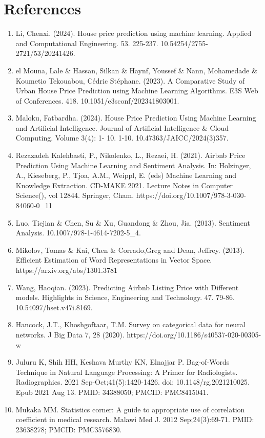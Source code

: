 \documentclass[a4paper,12pt]{article}
\begin{document}
\section*{References}
\begin{enumerate}
  \item Li, Chenxi. (2024). House price prediction using machine learning. Applied and Computational Engineering. 53. 225-237. 10.54254/2755-2721/53/20241426.
  \item el Mouna, Lale \& Hassan, Silkan \& Haynf, Youssef \& Nann, Mohamedade \& Koumetio Tekouabou, Cédric Stéphane. (2023). A Comparative Study of Urban House Price Prediction using Machine Learning Algorithms. E3S Web of Conferences. 418. 10.1051/e3sconf/202341803001. 
  \item Maloku, Fatbardha. (2024). House Price Prediction Using Machine Learning and Artificial Intelligence. Journal of Artificial Intelligence \& Cloud Computing. Volume 3(4): 1- 10. 1-10. 10.47363/JAICC/2024(3)357. 
  \item Rezazadeh Kalehbasti, P., Nikolenko, L., Rezaei, H. (2021). Airbnb Price Prediction Using Machine Learning and Sentiment Analysis. In: Holzinger, A., Kieseberg, P., Tjoa, A.M., Weippl, E. (eds) Machine Learning and Knowledge Extraction. CD-MAKE 2021. Lecture Notes in Computer Science(), vol 12844. Springer, Cham. https://doi.org/10.1007/978-3-030-84060-0\_11
  \item Luo, Tiejian \& Chen, Su \& Xu, Guandong \& Zhou, Jia. (2013). Sentiment Analysis. 10.1007/978-1-4614-7202-5\_4. 
  \item Mikolov, Tomas \& Kai, Chen \& Corrado,Greg and Dean, Jeffrey. (2013). Efficient Estimation of Word Representations in Vector Space. https://arxiv.org/abs/1301.3781
  \item Wang, Haoqian. (2023). Predicting Airbnb Listing Price with Different models. Highlights in Science, Engineering and Technology. 47. 79-86. 10.54097/hset.v47i.8169.
  \item Hancock, J.T., Khoshgoftaar, T.M. Survey on categorical data for neural networks. J Big Data 7, 28 (2020). https://doi.org/10.1186/s40537-020-00305-w
  \item Juluru K, Shih HH, Keshava Murthy KN, Elnajjar P. Bag-of-Words Technique in Natural Language Processing: A Primer for Radiologists. Radiographics. 2021 Sep-Oct;41(5):1420-1426. doi: 10.1148/rg.2021210025. Epub 2021 Aug 13. PMID: 34388050; PMCID: PMC8415041.
  \item Mukaka MM. Statistics corner: A guide to appropriate use of correlation coefficient in medical research. Malawi Med J. 2012 Sep;24(3):69-71. PMID: 23638278; PMCID: PMC3576830.

\end{enumerate}
\end{document}
